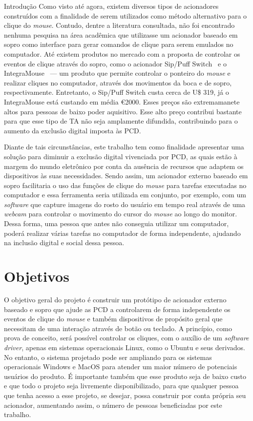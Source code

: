 \begin{chapter}{Introdução}
Como visto até agora, existem diversos tipos de acionadores construídos com a
finalidade de serem utilizados como método alternativo para o clique do
\textit{mouse}.  Contudo, dentre a literatura consultada, não foi encontrado
nenhuma pesquisa na área acadêmica que utilizasse um acionador baseado em sopro
como interface para gerar comandos de clique para serem emulados no computador.
Até existem produtos no mercado com a proposta de controlar os eventos de
clique através do sopro, como o acionador Sip/Puff Switch~\cite{SipPuff} e o
IntegraMouse~\cite{IntegraMouse} --- um produto que permite controlar o ponteiro do
\textit{mouse} e realizar cliques no computador, através dos movimentos da boca
e de sopro, respectivamente. Entretanto, o Sip/Puff Switch custa cerca
de U\$ 319, já o IntegraMouse está custando em média \euro 2000. Esses preços
são extremamanete altos para pessoas de baixo poder aquisitivo. Esse alto preço
contribui bastante para que esse tipo de TA não seja
amplamente difundida, contribuindo para o aumento da exclusão digital imposta às
PCD.

Diante de tais circunstâncias, este trabalho tem como finalidade apresentar  uma
solução para diminuir a exclusão digital vivenciada por PCD, as quais estão à
margem do mundo eletrônico por conta da ausência de recursos que adaptem os
dispositivos às suas necessidades. Sendo assim, um acionador externo baseado em
sopro facilitaria o uso das funções de clique do \textit{mouse} para tarefas
executadas no computador e essa ferramenta seria utilizada em conjunto, por
exemplo, com um \textit{software} que capture imagens do rosto do usuário em
tempo real através de uma \textit{webcam} para controlar o movimento do cursor
do \textit{mouse} ao longo do monitor. Dessa forma, uma pessoa que antes não
conseguia utilizar um computador, poderá realizar várias tarefas no computador
de forma independente, ajudando na inclusão digital e social dessa pessoa.

\section{Objetivos}

O objetivo geral do projeto é construir um protótipo de acionador externo
baseado e sopro que ajude as PCD a controlarem de forma independente os eventos
de clique do \textit{mouse} e também dispositivos de propósito geral que
necessitam de uma interação através de botão ou teclado. A princípio, como prova
de conceito, será possível controlar os cliques, com o auxílio de um
\textit{software driver}, apenas em sistemas operacionais Linux, como o Ubuntu e
seus derivados. No entanto, o sistema projetado pode ser ampliando para os
sistemas operacionais Windows e MacOS para atender um maior número de potenciais
usuários do produto. É importante também que esse produto seja de baixo custo e
que todo o projeto seja livremente disponibilizado, para que qualquer pessoa que
tenha acesso a esse projeto, se desejar, possa construir por conta própria seu
acionador, aumentando assim, o número de pessoas beneficiadas por este trabalho.


\end{chapter}
